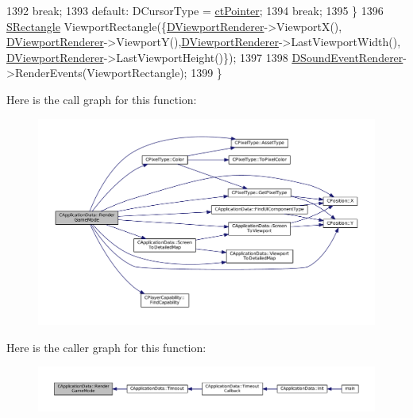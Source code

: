 \begin{DoxyCode}
1392                                     \textcolor{keywordflow}{break};
1393         \textcolor{keywordflow}{default}:                    DCursorType = \hyperlink{classCApplicationData_ad024b66b60017c45c47a85dbc636ae69aae3df9571a0bd8f05d668cca8871dbc0}{ctPointer};
1394                                     \textcolor{keywordflow}{break};
1395     \}
1396     \hyperlink{structSRectangle}{SRectangle} ViewportRectangle(\{\hyperlink{classCApplicationData_a31da050ebca942272344c8b736d72848}{DViewportRenderer}->ViewportX(),
      \hyperlink{classCApplicationData_a31da050ebca942272344c8b736d72848}{DViewportRenderer}->ViewportY(),\hyperlink{classCApplicationData_a31da050ebca942272344c8b736d72848}{DViewportRenderer}->LastViewportWidth(),
      \hyperlink{classCApplicationData_a31da050ebca942272344c8b736d72848}{DViewportRenderer}->LastViewportHeight()\});
1397     
1398     \hyperlink{classCApplicationData_af2959556fc881145d9d777c627a9345d}{DSoundEventRenderer}->RenderEvents(ViewportRectangle);
1399 \}
\end{DoxyCode}
Here is the call graph for this function\+:\nopagebreak
\begin{figure}[H]
\begin{center}
\leavevmode
\includegraphics[width=350pt]{classCApplicationData_ae5ba05c6fb7e6f0414c26f0b44bc842c_cgraph}
\end{center}
\end{figure}
Here is the caller graph for this function\+:\nopagebreak
\begin{figure}[H]
\begin{center}
\leavevmode
\includegraphics[width=350pt]{classCApplicationData_ae5ba05c6fb7e6f0414c26f0b44bc842c_icgraph}
\end{center}
\end{figure}
\hypertarget{classCApplicationData_a72fff3a266be49b3e9f323dcfe545923}{}\label{classCApplicationData_a72fff3a266be49b3e9f323dcfe545923} 
